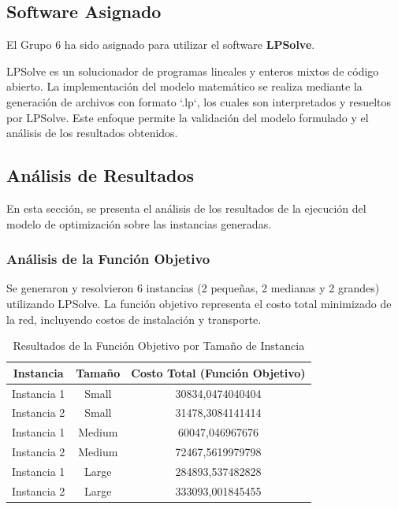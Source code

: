 \documentclass[12pt]{article}
\begin{document}
\subsection{Software Asignado}
El Grupo 6 ha sido asignado para utilizar el software \textbf{LPSolve}.

LPSolve es un solucionador de programas lineales y enteros mixtos de código abierto. La implementación del modelo matemático se realiza mediante la generación de archivos con formato `.lp`, los cuales son interpretados y resueltos por LPSolve. Este enfoque permite la validación del modelo formulado y el análisis de los resultados obtenidos.

\subsection{Análisis de Resultados}
En esta sección, se presenta el análisis de los resultados de la ejecución del modelo de optimización sobre las instancias generadas.

\subsubsection{Análisis de la Función Objetivo}
Se generaron y resolvieron 6 instancias (2 pequeñas, 2 medianas y 2 grandes) utilizando LPSolve. La función objetivo representa el costo total minimizado de la red, incluyendo costos de instalación y transporte.

\begin{table}[H]
    \centering
    \caption{Resultados de la Función Objetivo por Tamaño de Instancia}
    \label{tab:FO_resultados}
    \begin{tabular}{|c|c|c|}
        \hline
        \textbf{Instancia} & \textbf{Tamaño} & \textbf{Costo Total (Función Objetivo)} \\
        \hline
        Instancia 1 & Small & 30834,0474040404 \\
        Instancia 2 & Small & 31478,3084141414 \\
        \hline
        Instancia 1 & Medium & 60047,046967676 \\
        Instancia 2 & Medium & 72467,5619979798 \\
        \hline
        Instancia 1 & Large & 284893,537482828 \\
        Instancia 2 & Large & 333093,001845455 \\
        \hline
    \end{tabular}
\end{table}
\end{document}
